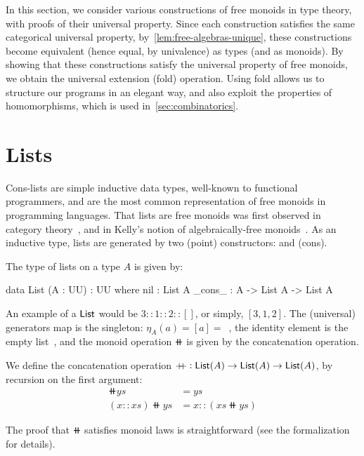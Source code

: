 \label{sec:monoids}

In this section, we consider various constructions of free monoids in type theory, with proofs of their universal
property.
%
Since each construction satisfies the same categorical universal property, by~\cref{lem:free-algebras-unique},
these constructions become equivalent (hence equal, by univalence) as types (and as monoids).
%
By showing that these constructions satisfy the universal property of free monoids, we obtain the universal extension
(fold) operation.
%
Using fold allows us to structure our programs in an elegant way, and also exploit the properties of homomorphisms,
which is used in~\cref{sec:combinatorics}.

\section{Lists}
\label{mon:lists}

Cons-lists are simple inductive data types, well-known to functional programmers,
and are the most common representation of free monoids in programming languages.
%
That lists are free monoids was first observed in category theory~\cite{dubucFreeMonoids1974}, and in Kelly's notion of
algebraically-free monoids~\cite{kellyUnifiedTreatmentTransfinite1980}.
%
As an inductive type, lists are generated by two (point) constructors:  and  (cons).
\begin{definition}[Lists]
    \label{def:lists}
    The type of lists on a type $A$ is given by:
    \begin{code}
data List (A : UU) : UU where
  nil : List A
  _cons_ : A -> List A -> List A
\end{code}
\end{definition}

An example of a $\operatorname{\mathsf{List}}$ would be $3 :: 1 :: 2 :: []$, or simply, $[3, 1, 2]$.
%
The (universal) generators map is the singleton: $\eta_A(a) = [a] =$~,
the identity element is the empty list~,
and the monoid operation $\doubleplus$ is given by the concatenation operation.

\begin{definition}[Concatenation]
    We define the concatenation operation $\mathbin{+\kern -0.4em+} : \operatorname{\mathsf{List}}(A) \to \operatorname{\mathsf{List}}(A) \to \operatorname{\mathsf{List}}(A)$,
    by recursion on the first argument:
    \begin{align*}
        [] \doubleplus ys        & = ys                       \\
        (x :: xs) \doubleplus ys & = x :: (xs \doubleplus ys)
    \end{align*}
\end{definition}
The proof that $\doubleplus$ satisfies monoid laws is straightforward (see the formalization for details).

